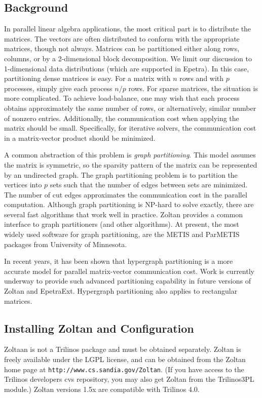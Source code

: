 \subsection{Background}
In parallel linear algebra applications, the most critical part is to 
distribute the matrices. The vectors are often distributed to conform
with the appropriate matrices, though not always. Matrices can
be partitioned either along rows, columns, or by a 2-dimensional
block decomposition. We limit our discussion to 1-dimensional data
distributions (which are supported in Epetra). In this case, 
partitioning dense matrices is easy.
For a matrix with $n$ rows and with $p$ processes, simply give
each process $n/p$  rows. For sparse matrices, the situation
is more complicated. To achieve load-balance, one may wish 
that each process obtains approximately the same number of rows,
or alternatively, similar number of nonzero entries. 
Additionally, the communication cost when applying the matrix
should be small. Specifically, for iterative solvers, the
communication cost in a matrix-vector product should be minimized.

A common abstraction of this problem is \emph{graph partitioning}.
This model assumes the matrix is symmetric, so the sparsity 
pattern of the matrix can be represented by an undirected graph.
The graph partitioning problem is to partition the
vertices into $p$ sets such that the number of edges between
sets are minimized. The number of cut edges approximates the
communication cost in the parallel computation. Although 
graph partitioning is NP-hard to solve exactly, there are
several fast algorithms that work well in practice. Zoltan
provides a common interface to graph partitioners (and other algorithms).
At present, the most widely used software for graph partitioning,
are the METIS and ParMETIS \cite{} packages from University of Minnesota.

In recent years, it has been shown \cite{Aykanat} that hypergraph partitioning 
is a more accurate model for parallel matrix-vector communication cost.
Work is currently underway to provide such advanced partitioning capability
in future versions of Zoltan and EpetraExt. Hypergraph partitioning
also applies to rectangular matrices.

\subsection{Installing Zoltan and Configuration}
Zoltaan is not a Trilinos package and must be obtained separately.
Zoltan is freely available under the LGPL license, and can
be obtained from the Zoltan home page at 
\texttt{http://www.cs.sandia.gov/Zoltan}. (If you have access
to the Trilinos developers cvs repository, you may also  
get Zoltan from the Trilinos3PL module.)
Zoltan versions 1.5x are compatible with Trilinos 4.0. 

